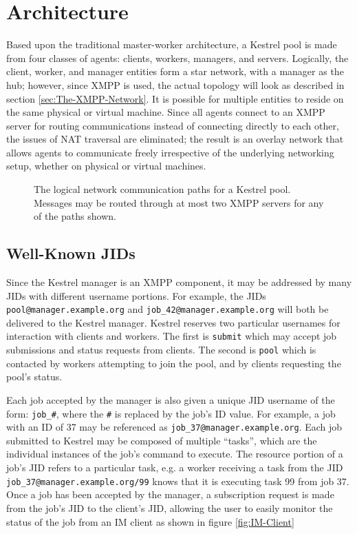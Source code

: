 \section{Architecture}
Based upon the traditional master-worker architecture, a Kestrel pool is made
from four classes of agents: clients, workers, managers, and servers. Logically,
the client, worker, and manager entities form a star network, with a manager as
the hub; however, since XMPP is used, the actual topology will look as described
in section \ref{sec:The-XMPP-Network}. It is possible for multiple entities to
reside on the same physical or virtual machine. Since all agents connect to an
XMPP server for routing communications instead of connecting directly to each
other, the issues of NAT traversal are eliminated; the result is an overlay
network that allows agents to communicate freely irrespective of the underlying
networking setup, whether on physical or virtual machines.

\begin{figure}
\caption{The logical network communication paths for a Kestrel pool. Messages
may be routed through at most two XMPP servers for any of the paths shown.}
\end{figure}

\subsection{Well-Known JIDs}
Since the Kestrel manager is an XMPP component, it may be addressed by many JIDs
with different username portions. For example, the JIDs \texttt{pool@manager.example.org}
and \texttt{job\_42@manager.example.org} will both be delivered to the Kestrel
manager. Kestrel reserves two particular usernames for interaction with clients
and workers. The first is \texttt{submit} which may accept job submissions and
status requests from clients. The second is \texttt{pool} which is contacted
by workers attempting to join the pool, and by clients requesting the pool's
status.

Each job accepted by the manager is also given a unique JID username of
the form: \texttt{job\_\#}, where the \texttt{\#} is replaced by the
job's ID value. For example, a job with an ID of 37 may be referenced as
\texttt{job\_37@manager.example.org}. Each job submitted to Kestrel may
be composed of multiple ``tasks'', which are the individual instances
of the job's command to execute. The resource portion of a job's JID
refers to a particular task, e.g. a worker receiving a task from the JID
\texttt{job\_37@manager.example.org/99} knows that it is executing task 99 from
job 37. Once a job has been accepted by the manager, a subscription request is
made from the job's JID to the client's JID, allowing the user to easily monitor
the status of the job from an IM client as shown in figure \ref{fig:IM-Client}

